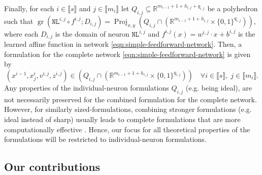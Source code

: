 \documentclass[smallextended]{svjour3}
\newcommand{\blue}[1]{{#1}}
\newcommand{\bbR}{\mathbb{R}}
\newcommand{\Conv}{\operatorname{Conv}}
\newcommand{\gr}{\operatorname{gr}}
\newcommand{\Proj}{\operatorname{Proj}}
\newcommand{\NL}{\texttt{NL}}
\begin{document}
\blue{Finally, for each  $i \in \llbracket s \rrbracket$ and $j \in \llbracket m_i \rrbracket$ let  
$Q_{i,j}\subseteq\bbR^{m_{i-1} + 1 + h_{i,j} + q_{i,j}}$ be a polyhedron such that $\gr(\NL^{i,j}{} \circ f^{i,j}; D_{i,j}) = \Proj_{x,y}\left(Q_{i,j} \cap (\bbR^{m_{i-1} + 1 + h_{i,j}} \times \{0,1\}^{ q_{i,j}})\right)$, where each $D_{i,j}$ is the domain of neuron $\NL^{i,j}$ and $f^{i,j}(x) = w^{i,j} \cdot x + b^{i,j}$ is the learned affine function in network \eqref{eqn:simple-feedforward-network}. Then, a formulation for the complete network \eqref{eqn:simple-feedforward-network} is given by 
\[ \left(x^{i-1},x^i_j,v^{i,j},z^{i,j}\right) \in \left(Q_{i,j} \cap (\bbR^{m_{i-1} + 1 + h_{i,j}} \times \{0,1\}^{ q_{i,j}})\right)\quad \forall i \in \llbracket s \rrbracket,\; j \in \llbracket m_i \rrbracket.\]
Any properties of the individual-neuron formulations $Q_{i,j}$ (e.g. being ideal), are not necessarily preserved for the combined formulation for the complete network. However, for similarly sized-formulations, combining stronger formulations (e.g. ideal instead of sharp) usually leads to complete formulations that are more computationally effective \cite{Vielma:2015}. Hence, our focus for all theoretical properties of the formulations will be restricted to individual-neuron formulations. }



\subsection{Our contributions}
\end{document}
